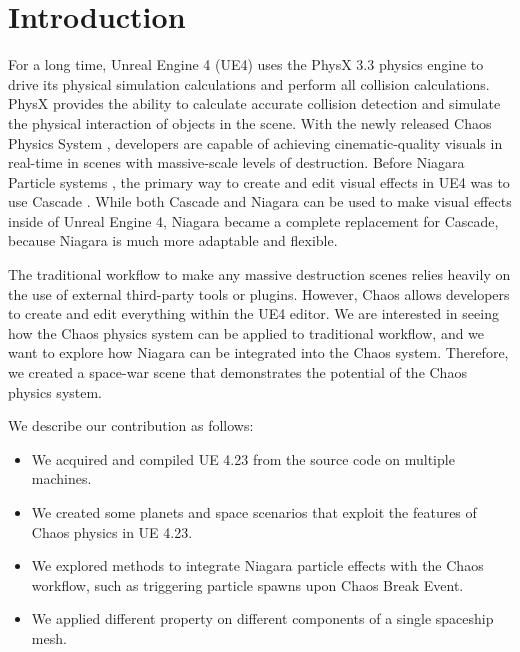 \documentclass[sigconf]{acmart}
\begin{document}
\maketitle

\section{Introduction}

For a long time, Unreal Engine 4 (UE4) uses the PhysX 3.3 physics engine \cite{physx} to drive its physical simulation calculations and perform all collision calculations. PhysX provides the ability to calculate accurate collision detection and simulate the physical interaction of objects in the scene. 
With the newly released Chaos Physics System \cite{ue4chaos}, developers are capable of achieving cinematic-quality visuals in real-time in scenes with massive-scale levels of destruction. Before Niagara Particle systems \cite{ue4Niagara}, the primary way to create and edit visual effects in UE4 was to use Cascade \cite{ue4cascade}. While both Cascade and Niagara can be used to make visual effects inside of Unreal Engine 4, Niagara became a complete replacement for Cascade, because Niagara is much more adaptable and flexible. 

The traditional workflow to make any massive destruction scenes relies heavily on the use of external third-party tools or plugins. However, Chaos allows developers to create and edit everything within the UE4 editor. We are interested in seeing how the Chaos physics system can be applied to traditional workflow, and we want to explore how Niagara can be integrated into the Chaos system. Therefore, we created a space-war scene that demonstrates the potential of the Chaos physics system.

We describe our contribution as follows:

\begin{itemize}
    \item We acquired and compiled UE 4.23 from the source code on multiple machines.
    \item We created some planets and space scenarios that exploit the features of Chaos physics in UE 4.23. 
    \item We explored methods to integrate Niagara particle effects with the Chaos workflow, such as triggering particle spawns upon Chaos Break Event. 
    \item We applied different property on different components of a single spaceship mesh.  
\end{itemize}
\end{document}
